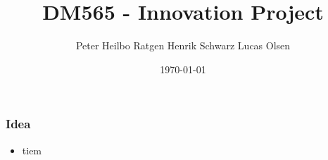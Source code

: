 \documentclass{beamer}
\title{DM565 - Innovation Project}
\author{Peter Heilbo Ratgen Henrik Schwarz Lucas Olsen}
\date{\today}
\begin{document}
\frame{\titlepage}

\begin{frame}
  \frametitle{Idea}
  \begin{itemize}
    \item tiem
  \end{itemize}
\end{frame}
\end{document}
